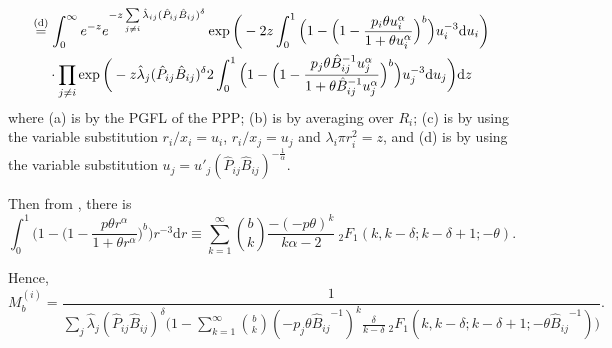 \documentclass[12pt,draftclsnofoot,journal,onecolumn]{IEEEtran}
\def\dd{\mathrm{d}}
\def\eqd{\stackrel{{\rm (d)}}{=}}
\begin{document}
\begin{IEEEproof}
\begin{align}
	&\eqd \int_0^\infty e^{-z} e^{-z\sum\limits_{j\neq i}\hat\lambda_{ij} (\hat P_{ij} \hat B_{ij})^{\delta}} \exp\bigg(-2z \int_0^1\Big(1-\Big(1-\frac{p_i \theta u_i^\alpha}{1+\theta u_i^\alpha}\Big)^b \Big)u_i^{-3}\dd u_i \bigg) \nonumber \\
	&~~~~\cdot \prod\limits_{j\neq i} \exp\bigg(-z \hat\lambda_j (\hat P_{ij} \hat B_{ij})^{\delta} 2\int_0^1\Big(1-\Big(1-\frac{p_j\theta\hat B_{ij}^{-1} u_j^\alpha}{1+\theta \hat B_{ij}^{-1} u_j^\alpha}\Big)^b \Big)u_j^{-3}\dd u_j \bigg) \dd z 
	\end{align}	
	where (a) is by the PGFL of the PPP; (b) is by averaging over $R_i$; (c) is by using the variable substitution $r_i/x_i=u_i$, $r_i/x_j=u_j$ and $\lambda_i \pi r_i^2=z$, and (d) is by using the variable substitution $u_j=u'_j(\hat P_{ij} \hat B_{ij})^{-\frac{1}{\alpha}}$.
	
	Then from \cite[Thm.~3]{MHmeta}, there is 
	\begin{equation}
	\label{eq:thm3proof}
	\int_0^1\Big(1-\Big(1-\frac{p\theta r^\alpha}{1+\theta r^\alpha}\Big)^b \Big)r^{-3}\dd r \equiv \sum_{k=1}^{\infty}\binom{b}{k} \frac{-(-p\theta)^k}{k\alpha-2} ~_2F_1(k,k-\delta; k-\delta+1; -\theta).
	\end{equation}
	
	Hence,
	\begin{equation}
	\label{eq:thm3proof2}
	M_b^{(i)} = \frac{1}{\sum\limits_j \hat\lambda_j (\hat P_{ij} \hat B_{ij})^\delta \Big(1- \sum_{k=1}^{\infty}\binom{b}{k} (-p_j\theta {\hat B_{ij}}^{-1})^k\frac{\delta}{k-\delta} ~_2F_1(k,k-\delta; k-\delta+1; -\theta {\hat B_{ij}}^{-1})\Big)}.
	\end{equation}	
\end{IEEEproof}
\end{document}
